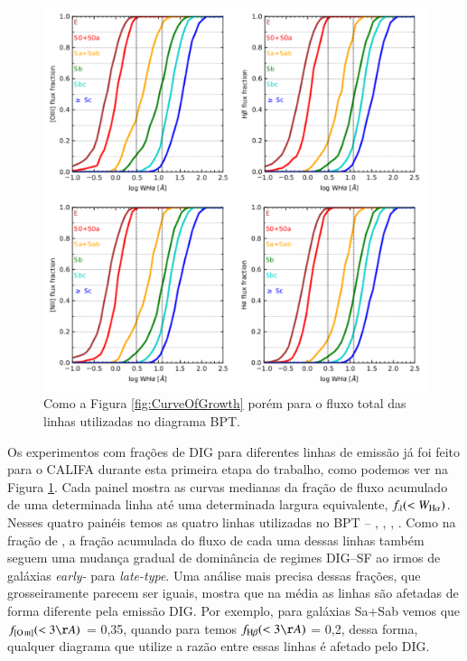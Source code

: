 \begin{figure}
	\centering
	\includegraphics[scale=0.9]{figuras/bptlines_fracDIG.pdf}
	\caption[Contribuição de DIG para os fluxos das linhas do BPT]
	{Como a Figura \ref{fig:CurveOfGrowth} porém para o fluxo total das linhas utilizadas no diagrama BPT.}
	\label{fig:bptlines_fracDIG}
\end{figure}

Os experimentos com frações de DIG para diferentes linhas de emissão já foi feito para o CALIFA durante esta primeira etapa do trabalho, como podemos ver na Figura \ref{fig:bptlines_fracDIG}. Cada painel mostra as curvas medianas da fração de fluxo acumulado de uma determinada linha até uma determinada largura equivalente, $f_\lambda (< W_{\Ha})$. Nesses quatro painéis temos as quatro linhas utilizadas no BPT -- \Hb, \oiii, \Ha, \nii. Como na fração de \Ha, a fração acumulada do fluxo de cada uma dessas linhas também seguem uma mudança gradual de dominância de regimes DIG--SF ao irmos de galáxias {\em early-} para {\em late-type}. Uma análise mais precisa dessas frações, que grosseiramente parecem ser iguais, mostra que na média as linhas são afetadas de forma diferente pela emissão DIG. Por exemplo, para galáxias Sa+Sab vemos que $f_{\oiii} (< 3 \AA)$ = 0,35, quando para \Hb temos $f_{\Hb} (< 3 \AA)$ = 0,2, dessa forma, qualquer diagrama que utilize a razão entre essas linhas é afetado pelo DIG.

